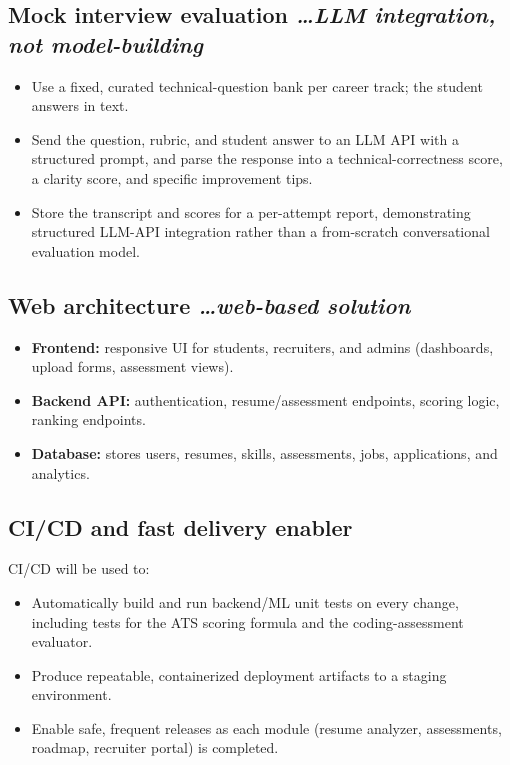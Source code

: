 \documentclass[11pt,a4paper]{article}
\newcommand{\BvrHint}[1]{%
  {\normalfont\normalsize\itshape\hfill #1}}
\begin{document}
\subsection{Mock interview evaluation  %
\BvrHint{\ldots LLM integration, not model-building}}
\begin{itemize}[leftmargin=0.7cm]
    \item Use a fixed, curated technical-question bank per career track; the student answers in text. 
     \item Send the question, rubric, and student answer to an LLM API with a structured prompt, and parse the response into a technical-correctness score, a clarity score, and specific improvement tips. 
     \item Store the transcript and scores for a per-attempt report, demonstrating structured LLM-API integration rather than a from-scratch conversational evaluation model.
\end{itemize}

\subsection{Web architecture  %
\BvrHint{\ldots web-based solution}}
\begin{itemize}[leftmargin=0.7cm]
    \item \textbf{Frontend:} responsive UI for students, recruiters, and admins (dashboards, upload forms, assessment views).
    \item \textbf{Backend API:} authentication, resume/assessment endpoints, scoring logic, ranking endpoints.
    \item \textbf{Database:} stores users, resumes, skills, assessments, jobs, applications, and analytics.

\end{itemize}

\subsection{CI/CD and fast delivery enabler}
CI/CD will be used to:
\begin{itemize}[leftmargin=0.7cm]
    \item Automatically build and run backend/ML unit tests on every change, including tests for the ATS scoring formula and the coding-assessment evaluator. 
    \item Produce repeatable, containerized deployment artifacts to a staging environment.
    \item Enable safe, frequent releases as each module (resume analyzer, assessments, roadmap, recruiter portal) is completed.
\end{itemize}
\end{document}
